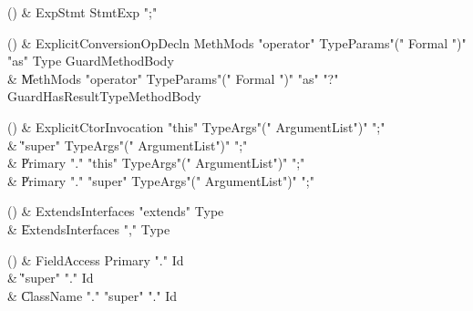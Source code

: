 \begin{bbgrammarappendix}

() & ExpStmt \label{prod:ExpStmt}  \: StmtExp \xcd";"  \\


\end{bbgrammarappendix}

\begin{bbgrammarappendix}

() & ExplicitConversionOpDecln \label{prod:ExplicitConversionOpDecln}  \: MethMods \xcd"operator" TypeParams\opt \xcd"(" Formal  \xcd")" \xcd"as" Type Guard\opt MethodBody  \\

 &    \| MethMods \xcd"operator" TypeParams\opt \xcd"(" Formal  \xcd")" \xcd"as" \xcd"?" Guard\opt HasResultType\opt MethodBody \\

\end{bbgrammarappendix}

\begin{bbgrammarappendix}

() & ExplicitCtorInvocation \label{prod:ExplicitCtorInvocation}  \: \xcd"this" TypeArgs\opt \xcd"(" ArgumentList\opt \xcd")" \xcd";"  \\

 &    \| \xcd"super" TypeArgs\opt \xcd"(" ArgumentList\opt \xcd")" \xcd";" \\
 &    \| Primary \xcd"." \xcd"this" TypeArgs\opt \xcd"(" ArgumentList\opt \xcd")" \xcd";" \\
 &    \| Primary \xcd"." \xcd"super" TypeArgs\opt \xcd"(" ArgumentList\opt \xcd")" \xcd";" \\

\end{bbgrammarappendix}

\begin{bbgrammarappendix}

() & ExtendsInterfaces \label{prod:ExtendsInterfaces}  \: \xcd"extends" Type  \\

 &    \| ExtendsInterfaces \xcd"," Type \\

\end{bbgrammarappendix}

\begin{bbgrammarappendix}

() & FieldAccess \label{prod:FieldAccess}  \: Primary \xcd"." Id  \\

 &    \| \xcd"super" \xcd"." Id \\
 &    \| ClassName \xcd"." \xcd"super"  \xcd"." Id \\

\end{bbgrammarappendix}

